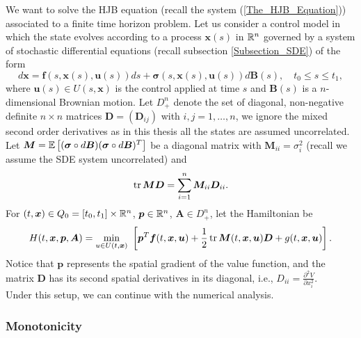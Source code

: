 We want to solve the HJB equation (recall the system (\ref{The_HJB_Equation})) associated 
to a finite time horizon problem. Let us consider a control model in which the state evolves 
according to a process $\bm{x}(s)$ in $\mathbb{R}^n$ governed by a system of stochastic differential 
equations (recall subsection \ref{Subsection_SDE}) of the form
\begin{equation}
d\bm{x}=\bm{f}(s,\bm{x}(s),\bm{u}(s))ds+\bm{\sigma}(s,\bm{x}(s),\bm{u}(s))d\bm{B}(s),\quad t_0\leq s\leq t_1,
\end{equation}
where $\bm{u}(s)\in U(s,\bm{x})$ is the control applied at time $s$ and $\bm{B}(s)$ is a 
$n$-dimensional Brownian motion. Let $D_+^n$ denote the set of diagonal, non-negative definite 
$n\times n$ matrices $\bm{D}=(\bm{D}_{ij})$ with $i,j=1,\dots,n$, we ignore the mixed second order derivatives as in this thesis all the states are assumed uncorrelated. Let $\bm{M}=\mathbb{E}\left[(\bm{\sigma}\circ d\bm{B})(\bm{\sigma}\circ d\bm{B})^T\right]$ be a diagonal matrix with $\bm{M}_{ii}=\sigma_i^2$ (recall we assume the SDE system uncorrelated) and
\begin{equation*}
\operatorname{tr} \bm{M}\bm{D}=\sum_{i=1}^n\bm{M}_{ii}\bm{D}_{ii}.
\end{equation*}
For $(t,\bm{x})\in Q_0=[t_0,t_1]\times\mathbb{R}^n$, $\bm{p}\in\mathbb{R}^n$, $\bm{A}\in D^n_+$, let the Hamiltonian be
\begin{equation*}
H(t,\bm{x},\bm{p},\bm{A})=\min_{u\in U(t,\bm{x})}\ \left[\bm{p}^T\bm{f}(t,\bm{x},\bm{u})+\frac{1}{2}\tr\bm{M}(t,\bm{x},\bm{u})\bm{D}+g(t,\bm{x},\bm{u})\right].
\label{Hamiltonian}
\end{equation*}
Notice that $\bm{p}$ represents the spatial gradient of the value function, and the matrix $\bm{D}$ has 
its second spatial derivatives in its diagonal, i.e., $D_{ii} = \frac{{\partial}^2V}{\partial x_i^2}$.\\
Under this setup, we can continue with the numerical analysis.

\subsubsection{Monotonicity} \label{Monotonicity}

